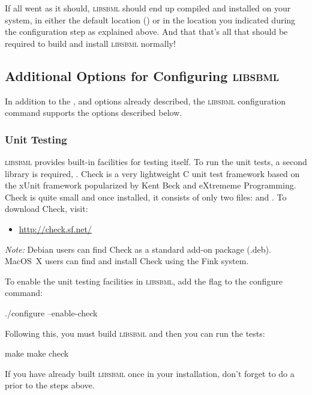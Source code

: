 \documentclass{sbmlmanual}
\newcommand{\libsbml}{\textsc{libsbml}}
\begin{document}
If all went as it should, \libsbml{} should end up compiled and installed
on your system, in either the default location () or in
the location you indicated during the configuration step as explained
above.  And that that's all that should be required to build and install
\libsbml{} normally!


\subsection{Additional Options for Configuring \libsbml{}}

In addition to the ,  and
 options already described, the \libsbml{}
configuration command supports the options described below.

\subsubsection{Unit Testing}

\libsbml{} provides built-in facilities for testing itself.  To run the
unit tests, a second library is required, .  Check is a
very lightweight C unit test framework based on the xUnit framework
popularized by Kent Beck and eXtrememe Programming.  Check is quite small
and once installed, it consists of only two files:  and
.  To download Check, visit:

\begin{itemize}
  \item \url{http://check.sf.net/}
\end{itemize}

\emph{Note:} Debian users can find Check as a standard add-on package
(.deb).  MacOS~X users can find and install Check using the Fink system.

To enable the unit testing facilities in \libsbml{}, add the
 flag to the configure command:

\begin{example}[csh]
  ./configure --enable-check
\end{example}

Following this, you must build \libsbml{} and then you can run the tests:

\begin{example}[csh]
  make
  make check
\end{example}

If you have already built \libsbml{} once in your installation, don't
forget to do a  prior to the steps above.
\end{document}

